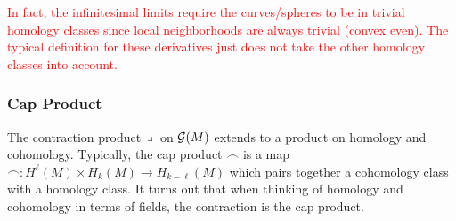\documentclass{article}
\begin{document}
\textcolor{red}{In fact, the infinitesimal limits require the curves/spheres to be in trivial homology classes since local neighborhoods are always trivial (convex even). The typical definition for these derivatives just does not take the other homology classes into account.}



\subsubsection{Cap Product}

The contraction product $\hspace*{.5mm}\lrcorner \hspace*{.5mm}$ on $\mathcal{G}(M)$ extends to a product on homology and cohomology. Typically, the cap product $\frown$ is a map $\frown \colon H^\ell(M) \times H_k(M) \to H_{k-\ell}(M)$ which pairs together a cohomology class with a homology class. It turns out that when thinking of homology and cohomology in terms of fields, the contraction is the cap product.
\end{document}
